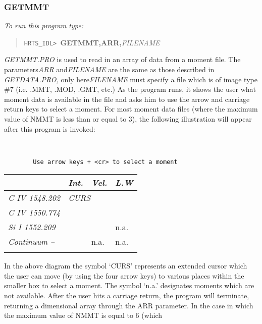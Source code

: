\subsubsection{GETMMT}

{\em To run this program type:}
\begin{quote}
{\tt HRTS\_IDL> }{\bf GETMMT,ARR,}{\it FILENAME}
\end{quote}
{\em GETMMT.PRO} is used to read in an array of data from a moment file.
  The parameters{\em ARR} and{\em FILENAME} are the same as those described in
 {\em GETDATA.PRO,} only here{\em FILENAME} must specify a file which is of
  image type \#7 (i.e. .MMT, .MOD, .GMT, etc.)  As the program runs, it
  shows the user what moment data is available in the file and asks him
  to use the arrow and carriage return keys to select a moment.
  For most moment data files (where the maximum value of NMMT is less
  than or equal to 3), the following illustration will appear after this
  program is invoked:
\begin{verbatim}


        Use arrow keys + <cr> to select a moment
\end{verbatim}
\begin{center}
\begin{tabular}{|l l l l l|}
\hline
                &        & {\em Int.} & {\em Vel.} & {\em L.W} \\
\hline
\multicolumn{2}{|l|}{\em C IV  1548.202} & \multicolumn{3}{l|}{\em CURS} \\
\cline{3-5}
\multicolumn{2}{|l|}{\em C IV  1550.774} & \multicolumn{3}{l|}{} \\
\multicolumn{2}{|l|}{\em Si I  1552.209} & \multicolumn{2}{l}{} &
\multicolumn{1}{l|}{n.a.} \\
\multicolumn{2}{|l|}{\em Continuum --} & \multicolumn{1}{l}{} &
\multicolumn{1}{l}{n.a.} & \multicolumn{1}{l|}{n.a.} \\ \cline{3-5}
     &  &  &  &  \\ \hline
\end{tabular}
\end{center}
  In the above diagram the symbol `CURS' represents an extended cursor
  which the user can move (by using the four arrow keys) to various
  places within the smaller box to select a moment.  The symbol `n.a.'
  designates moments which are not available.  After the user hits a
  carriage return, the program will terminate, returning a
  dimensional array through the ARR parameter.
  In the case in which the maximum value of NMMT is equal to 6 (which
